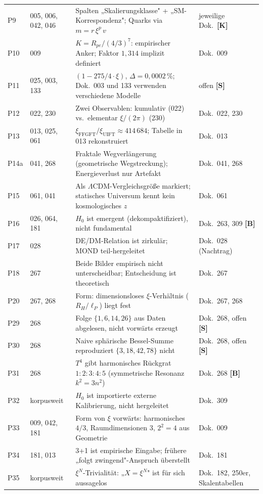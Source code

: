 \begin{longtable}{@{}p{1.2cm}p{3.4cm}p{5.8cm}p{3.4cm}@{}}
P9 & 005, 006, 042, 046 & Spalten „Skalierungsklasse" + „SM-Korrespondenz"; Quarks via $m = r\,\xi^p\,v$ & jeweilige Dok.~\textbf{[K]} \\
P10 & 009 & $K = R_{pe}/(4/3)^7$: empirischer Anker; Faktor $1{,}314$ implizit definiert & Dok.~009 \\
P11 & 025, 003, 133 & $(1-275/4\cdot\xi)$, $\Delta=0{,}0002\,\%$; Dok.~003 und 133 verwenden verschiedene Modelle & offen \textbf{[S]} \\
P12 & 022, 230 & Zwei Observablen: kumulativ (022) vs.\ elementar $\xi/(2\pi)$ (230) & Dok.~022, 230 \\
P13 & 013, 025, 061 & $\xi_\text{FFGFT}/\xi_\text{UIFT} \approx 414\,684$; Tabelle in 013 rekonstruiert & Dok.~013 \\
P14a & 041, 268 & Fraktale Wegverlängerung (geometrische Wegstreckung); Energieverlust nur Artefakt & Dok.~041, 268 \\
P15 & 061, 041 & Als $\Lambda$CDM-Vergleichsgröße markiert; statisches Universum kennt kein kosmologisches $z$ & Dok.~061 \\
P16 & 026, 064, 181 & $H_0$ ist emergent (dekompaktifiziert), nicht fundamental & Dok.~263, 309 \textbf{[B]} \\
P17 & 028 & DE/DM-Relation ist zirkulär; MOND teil-hergeleitet & Dok.~028 (Nachtrag) \\
P18 & 267 & Beide Bilder empirisch nicht unterscheidbar; Entscheidung ist theoretisch & Dok.~267 \\
P20 & 267, 268 & Form: dimensionsloses $\xi$-Verhältnis ($R_H/\ell_P$) liegt fest & Dok.~267, 268 \\
P29 & 268 & Folge $\{1,6,14,26\}$ aus Daten abgelesen, nicht vorwärts erzeugt & Dok.~268, offen \textbf{[S]} \\
P30 & 268 & Naive sphärische Bessel-Summe reproduziert $\{3,18,42,78\}$ nicht & Dok.~268, offen \textbf{[S]} \\
P31 & 268 & $T^4$ gibt harmonisches Rückgrat $1:2:3:4:5$ (symmetrische Resonanz $k^2=3n^2$) & Dok.~268 \textbf{[B]} \\
P32 & korpusweit & $H_0$ ist importierte externe Kalibrierung, nicht hergeleitet & Dok.~309 \\
P33 & 009, 042, 181 & Form von $\xi$ vorwärts: harmonisches $4/3$, Raumdimensionen $3$, $2^2=4$ aus Geometrie & Dok.~009 \\
P34 & 181, 013 & 3+1 ist empirische Eingabe; frühere „folgt zwingend"-Anspruch überstellt & Dok.~181 \\
P35 & korpusweit & $\xi^N$-Trivialität: „$X=\xi^N$" ist für sich aussagelos & Dok.~182, 250er, Skalentabellen \\

\end{longtable}
